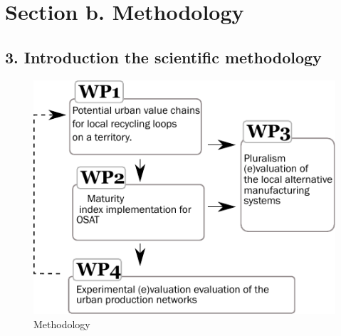 \documentclass[
  12pt,
  a4paperpaper,
  onecolumn]{article}
\begin{document}
\hypertarget{section-b.-methodology}{%
\section{Section b. Methodology}\label{section-b.-methodology}}

\hypertarget{introduction-the-scientific-methodology}{%
\subsection{3. Introduction the scientific
methodology}\label{introduction-the-scientific-methodology}}

\begin{figure}
\centering
    \includegraphics[width=\linewidth]{Figures/WPs.pdf}
    \caption{Methodology}
    \label{fig:WPs}
\end{figure}
\end{document}

